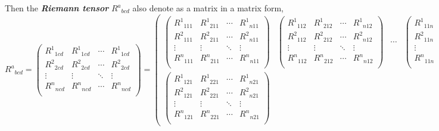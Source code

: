 \documentclass[11pt]{article}
\begin{document}
Then the \textbf{\emph{Riemann tensor}} \({R^{a}}_{bcd}\) also denote as
a matrix in a matrix form, \[
{R^{a}}_{bcd} = \begin{pmatrix}
 {R^{1}}_{1cd} & {R^{1}}_{1cd} & \cdots &  {R^{1}}_{1cd} \\ 
 {R^{2}}_{2cd} & {R^{2}}_{2cd} & \cdots &  {R^{2}}_{2cd} \\ 
 \vdots & \vdots & \ddots &\vdots \\ 
 {R^{n}}_{ncd} & {R^{n}}_{ncd} & \cdots &  {R^{n}}_{ncd} \\ 
\end{pmatrix}
= \begin{pmatrix}
\begin{pmatrix}
{R^{1}}_{111} & {R^{1}}_{211} & \cdots & {R^{1}}_{n11} \\ 
{R^{2}}_{111} & {R^{2}}_{211} & \cdots & {R^{2}}_{n11} \\ 
 \vdots & \vdots & \ddots &\vdots \\ 
{R^{n}}_{111} & {R^{n}}_{211} & \cdots & {R^{n}}_{n11} \\ 
\end{pmatrix} & \begin{pmatrix}
{R^{1}}_{112} & {R^{1}}_{212} & \cdots & {R^{1}}_{n12} \\ 
{R^{2}}_{112} & {R^{2}}_{212} & \cdots & {R^{2}}_{n12} \\ 
 \vdots & \vdots & \ddots &\vdots \\ 
{R^{n}}_{112} & {R^{n}}_{212} & \cdots & {R^{n}}_{n12} \\ 
\end{pmatrix} & \cdots & \begin{pmatrix}
{R^{1}}_{11n} & {R^{1}}_{21n} & \cdots & {R^{1}}_{n1n} \\ 
{R^{2}}_{11n} & {R^{2}}_{21n} & \cdots & {R^{2}}_{n1n} \\ 
 \vdots & \vdots & \ddots &\vdots \\ 
{R^{n}}_{11n} & {R^{n}}_{21n} & \cdots & {R^{n}}_{n1n} \\ 
\end{pmatrix} \\ 
\begin{pmatrix}
{R^{1}}_{121} & {R^{1}}_{221} & \cdots & {R^{1}}_{n21} \\ 
{R^{2}}_{121} & {R^{2}}_{221} & \cdots & {R^{2}}_{n21} \\ 
 \vdots & \vdots & \ddots &\vdots \\ 
{R^{n}}_{121} & {R^{n}}_{221} & \cdots & {R^{n}}_{n21} \\ 

\end{pmatrix}
\end{pmatrix}\]
\end{document}
